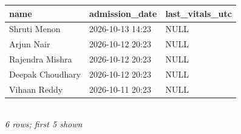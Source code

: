 {\scriptsize\setlength{\tabcolsep}{2.5pt}\begin{tabular}{lll}\toprule
\textbf{name} & \textbf{admission\_date} & \textbf{last\_vitals\_utc} \\\midrule
Shruti Menon & 2026-10-13 14:23 & NULL \\
Arjun Nair & 2026-10-12 20:23 & NULL \\
Rajendra Mishra & 2026-10-12 20:23 & NULL \\
Deepak Choudhary & 2026-10-12 20:23 & NULL \\
Vihaan Reddy & 2026-10-11 20:23 & NULL \\
\bottomrule\end{tabular}}\\[-1pt]{\tiny\itshape 6 rows; first 5 shown}
